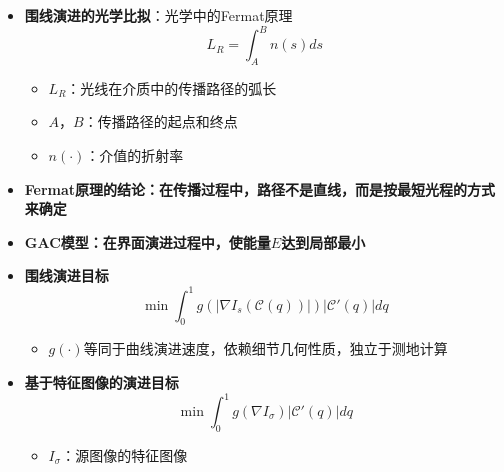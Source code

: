 \begin{frame}
\begin{itemize}
 \item \textbf{围线演进的光学比拟}：光学中的Fermat原理
\begin{equation*}
L_{R} = \int_{A}^{B} n(s) ds
\end{equation*}
\begin{itemize}
\item $L_{R}$：光线在介质中的传播路径的弧长
\item $A$，$B$：传播路径的起点和终点
\item $n(\cdot)$：介值的折射率
\end{itemize}
 \item \textbf{Fermat原理的结论：在传播过程中，路径不是直线，而是按最短光程的方式来确定}
 \item \textbf{GAC模型：在界面演进过程中，使能量$E$达到局部最小}
\end{itemize}
\end{frame}

\begin{frame}
\begin{itemize}
 \item \textbf{围线演进目标}
\begin{equation*}
\min \int_0^1 g(|\nabla I_{s} ( \mathcal{C} (q) )|) |\mathcal{C}' (q)| dq
\end{equation*}
\begin{itemize}
\item $g(\cdot)$等同于曲线演进速度，依赖细节几何性质，独立于测地计算
\end{itemize}
 \item \textbf{基于特征图像的演进目标}
\begin{equation*}
\min \int_0^1 g(\nabla I_{\sigma}) |\mathcal{C}' (q)| dq
\end{equation*}
\begin{itemize}
\item $I_{\sigma}$：源图像的特征图像
\end{itemize}
\end{itemize}
\end{frame}

